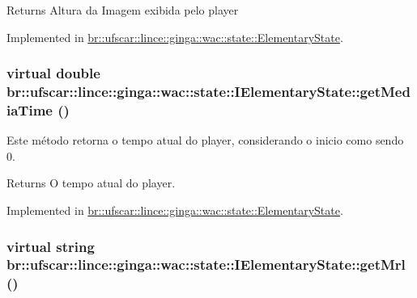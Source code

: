 \begin{DoxyReturn}{Returns}
Altura da Imagem exibida pelo player 
\end{DoxyReturn}


Implemented in \hyperlink{classbr_1_1ufscar_1_1lince_1_1ginga_1_1wac_1_1state_1_1ElementaryState_afe5f10172203bf1bc6064166658de738}{br::ufscar::lince::ginga::wac::state::ElementaryState}.

\hypertarget{classbr_1_1ufscar_1_1lince_1_1ginga_1_1wac_1_1state_1_1IElementaryState_a2dd09dc8dcee4eb6a4b23fe4d1f001ad}{
\subsubsection[{getMediaTime}]{\setlength{\rightskip}{0pt plus 5cm}virtual double br::ufscar::lince::ginga::wac::state::IElementaryState::getMediaTime ()}}
\label{classbr_1_1ufscar_1_1lince_1_1ginga_1_1wac_1_1state_1_1IElementaryState_a2dd09dc8dcee4eb6a4b23fe4d1f001ad}


Este método retorna o tempo atual do player, considerando o inicio como sendo 0. 

\begin{DoxyReturn}{Returns}
O tempo atual do player. 
\end{DoxyReturn}


Implemented in \hyperlink{classbr_1_1ufscar_1_1lince_1_1ginga_1_1wac_1_1state_1_1ElementaryState_a05bc58afddd1713b6300f383b7e26826}{br::ufscar::lince::ginga::wac::state::ElementaryState}.

\hypertarget{classbr_1_1ufscar_1_1lince_1_1ginga_1_1wac_1_1state_1_1IElementaryState_a5fae9abe330000d369a739626d089a87}{
\subsubsection[{getMrl}]{\setlength{\rightskip}{0pt plus 5cm}virtual string br::ufscar::lince::ginga::wac::state::IElementaryState::getMrl ()}}
\label{classbr_1_1ufscar_1_1lince_1_1ginga_1_1wac_1_1state_1_1IElementaryState_a5fae9abe330000d369a739626d089a87}


